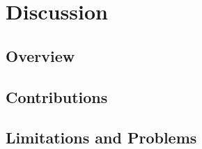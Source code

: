 \chapter{Discussion}

\section{Overview}

\section{Contributions}

\section{Limitations and Problems}
